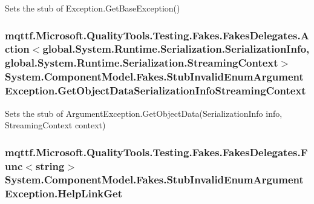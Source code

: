 Sets the stub of Exception.\-Get\-Base\-Exception()

\hypertarget{class_system_1_1_component_model_1_1_fakes_1_1_stub_invalid_enum_argument_exception_ab76e35651786e84937ea74446584f129}{
\subsubsection[{Get\-Object\-Data\-Serialization\-Info\-Streaming\-Context}]{\setlength{\rightskip}{0pt plus 5cm}mqttf.\-Microsoft.\-Quality\-Tools.\-Testing.\-Fakes.\-Fakes\-Delegates.\-Action$<$global.\-System.\-Runtime.\-Serialization.\-Serialization\-Info, global.\-System.\-Runtime.\-Serialization.\-Streaming\-Context$>$ System.\-Component\-Model.\-Fakes.\-Stub\-Invalid\-Enum\-Argument\-Exception.\-Get\-Object\-Data\-Serialization\-Info\-Streaming\-Context}}\label{class_system_1_1_component_model_1_1_fakes_1_1_stub_invalid_enum_argument_exception_ab76e35651786e84937ea74446584f129}


Sets the stub of Argument\-Exception.\-Get\-Object\-Data(\-Serialization\-Info info, Streaming\-Context context)

\hypertarget{class_system_1_1_component_model_1_1_fakes_1_1_stub_invalid_enum_argument_exception_aefa01214411c544149292091d807b9e2}{
\subsubsection[{Help\-Link\-Get}]{\setlength{\rightskip}{0pt plus 5cm}mqttf.\-Microsoft.\-Quality\-Tools.\-Testing.\-Fakes.\-Fakes\-Delegates.\-Func$<$string$>$ System.\-Component\-Model.\-Fakes.\-Stub\-Invalid\-Enum\-Argument\-Exception.\-Help\-Link\-Get}}\label{class_system_1_1_component_model_1_1_fakes_1_1_stub_invalid_enum_argument_exception_aefa01214411c544149292091d807b9e2}


